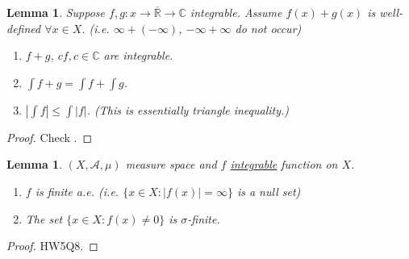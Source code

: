 \documentclass{report}
\newcommand{\R}{\mathbb{R}}
\newcommand{\C}{\mathbb{C}}
\newtheorem{lemma}[theorem]{Lemma}
\theoremstyle{definition}
\theoremstyle{remark}
\begin{document}
\begin{lemma}
	Suppose $f, g: x \to \overline{\R} \to \C$ integrable.
	Assume $f(x) + g(x)$ is well-defined $\forall x \in X$. (i.e. $\infty + (-\infty)$, $-\infty + \infty$ do not occur) \begin{enumerate}
		\item $f + g$, $cf, c \in \C$ are integrable.
		\item $\displaystyle \int f + g = \int f + \int g$.
		\item $\displaystyle \left|\int f\right| \leq \int |f|$. (This is essentially triangle inequality.)
	\end{enumerate}
\end{lemma}
\begin{proof}
	Check \cite[p.53]{follandRealAnalysisModern1999}.
\end{proof}
\begin{lemma}
	$(X, \mathcal{A}, \mu)$ measure space and $f$ \underline{integrable} function on $X$.
	\begin{enumerate}
		\item $f$ is finite a.e. (i.e. $\{x \in X: |f(x)| = \infty\}$ is a null set)
		\item The set $\{x \in X: f(x) \neq 0\}$ is $\sigma$-finite.
	\end{enumerate}
\end{lemma}
\begin{proof}
	HW5Q8.
\end{proof}
\end{document}
